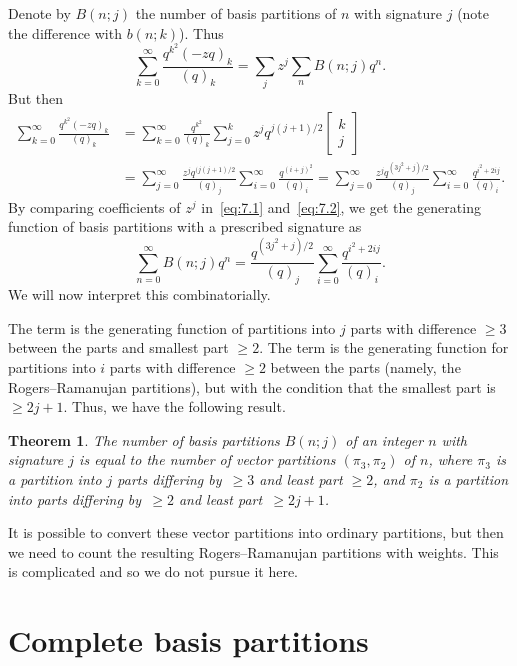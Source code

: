 \documentclass[pdftex]{sigma}
\numberwithin{equation}{section}
\newtheorem{Theorem}{Theorem}[section]
\theoremstyle{definition}
\newcommand{\qbin}[2]{\left[\begin{matrix} #1 \\ #2 \end{matrix} \right]}
\begin{document}
Denote by $B(n;j)$ the number of basis partitions of $n$ with signature
$j$ (note the difference with $b(n;k)$). Thus
\begin{equation}
\sum^{\infty}_{k=0}\frac{q^{k^2}(-zq)_k}{(q)_k}=
\sum_j z^j\sum_nB(n;j)q^n.\label{eq:7.1}
\end{equation}
But then
\begin{align}
\sum^{\infty}_{k=0}\frac{q^{k^2}(-zq)_k}{(q)_k}& =
\sum^{\infty}_{k=0}\frac{q^{k^2}}{(q)_k}\sum^k_{j=0}z^jq^{j(j+1)/2}
\qbin{k}{j}
\nonumber\\
& =\sum^{\infty}_{j=0}\frac{z^jq^{(j(j+1)/2}}{(q)_j}
\sum^{\infty}_{i=0}\frac{q^{(i+j)^2}}{(q)_i}=
\sum^{\infty}_{j=0}\frac{z^jq^{(3j^2+j)/2}}{(q)_j}
\sum^{\infty}_{i=0}\frac{q^{i^2+2ij}}{(q)_i}.\label{eq:7.2}
\end{align}
By comparing coefficients of $z^j$ in~\eqref{eq:7.1} and~\eqref{eq:7.2}, we get the
generating function of basis partitions with a prescribed signature as
\begin{equation*}
\sum^{\infty}_{n=0}B(n;j)q^n=
\frac{q^{(3j^2+j)/2}}{(q)_j}
\sum^{\infty}_{i=0}\frac{q^{i^2+2ij}}{(q)_i}.%
\end{equation*}
We will now interpret this combinatorially.

The term
is the generating function of partitions into $j$ parts with difference
$\ge 3$ between the parts and smallest part $\ge 2$. The term
is the generating function for partitions into $i$ parts with difference
$\ge 2$ between the parts (namely, the Rogers--Ramanujan partitions), but
with the condition that the smallest part is~${\ge 2j+1}$. Thus, we have
the following result.

\begin{Theorem}%
The number of basis partitions $B(n;j)$ of an integer $n$ with signature $j$ is equal to the number of vector partitions
$(\pi_3,\pi_2)$ of $n$, where $\pi_3$ is a partition into $j$ parts
differing by~$\ge 3$ and least part $\ge 2$, and $\pi_2$
is a partition into parts differing by~$\ge 2$ and least part~${\ge 2j+1}$.
\end{Theorem}

It is possible to convert these vector partitions into ordinary partitions,
but then we need to count the resulting Rogers--Ramanujan partitions with
weights. This is complicated and so we do not pursue it here.

\section{Complete basis partitions}
\end{document}
